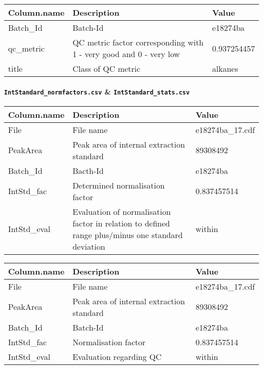 \documentclass[]{book}
\let\oldparagraph\paragraph
\renewcommand{\paragraph}[1]{\oldparagraph{#1}\mbox{}}
\begin{document}
\begin{tabu} to 
\toprule
Column.name & Description & Value\\
\midrule
{}  Batch\_Id & Batch-Id & e18274ba\\
qc\_metric & QC metric factor corresponding with 1 - very good and 0 - very low & 0.937254457\\
  title & Class of QC metric & alkanes\\
\bottomrule
\end{tabu}

\hypertarget{intstandard_normfactors.csv-intstandard_stats.csv}{%
\paragraph{\texorpdfstring{\texttt{IntStandard\_normfactors.csv} \& \texttt{IntStandard\_stats.csv}}{IntStandard\_normfactors.csv \& IntStandard\_stats.csv}}\label{intstandard_normfactors.csv-intstandard_stats.csv}}

\begin{tabu} to 
\toprule
Column.name & Description & Value\\
\midrule
{}  File & File name & e18274ba\_17.cdf\\
PeakArea & Peak area of internal extraction standard & 89308492\\
  Batch\_Id & Bacth-Id & e18274ba\\
IntStd\_fac & Determined normalisation factor & 0.837457514\\
  IntStd\_eval & Evaluation of normalisation factor in relation to defined range plus/minus one standard deviation & within\\
\bottomrule
\end{tabu}

\begin{tabu} to 
\toprule
Column.name & Description & Value\\
\midrule
{}  File & File name & e18274ba\_17.cdf\\
PeakArea & Peak area of internal extraction standard & 89308492\\
  Batch\_Id & Batch-Id & e18274ba\\
IntStd\_fac & Normalisation factor & 0.837457514\\
  IntStd\_eval & Evaluation regarding QC & within\\
\bottomrule
\end{tabu}
\end{document}
